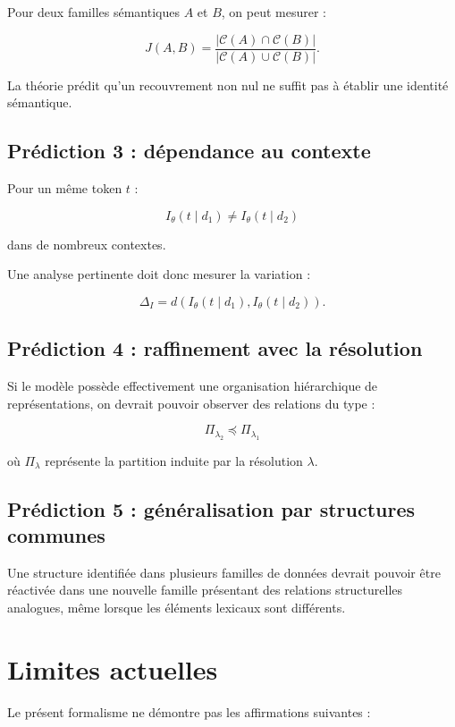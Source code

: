 \documentclass[11pt,a4paper]{article}
\begin{document}
Pour deux familles sémantiques $A$ et $B$, on peut mesurer :

\[
J(A,B)
=
\frac{
|\mathcal C(A)\cap\mathcal C(B)|
}{
|\mathcal C(A)\cup\mathcal C(B)|
}.
\]

La théorie prédit qu'un recouvrement non nul ne suffit pas à établir
une identité sémantique.

\subsection{Prédiction 3 : dépendance au contexte}

Pour un même token $t$ :

\[
I_\theta(t\mid d_1)
\neq
I_\theta(t\mid d_2)
\]

dans de nombreux contextes.

Une analyse pertinente doit donc mesurer la variation :

\[
\Delta_I
=
d
\left(
I_\theta(t\mid d_1),
I_\theta(t\mid d_2)
\right).
\]

\subsection{Prédiction 4 : raffinement avec la résolution}

Si le modèle possède effectivement une organisation hiérarchique de
représentations, on devrait pouvoir observer des relations du type :

\[
\Pi_{\lambda_2}
\preceq
\Pi_{\lambda_1}
\]

où $\Pi_\lambda$ représente la partition induite par la résolution
$\lambda$.

\subsection{Prédiction 5 : généralisation par structures communes}

Une structure identifiée dans plusieurs familles de données devrait pouvoir
être réactivée dans une nouvelle famille présentant des relations
structurelles analogues, même lorsque les éléments lexicaux sont différents.

\section{Limites actuelles}

Le présent formalisme ne démontre pas les affirmations suivantes :
\end{document}
